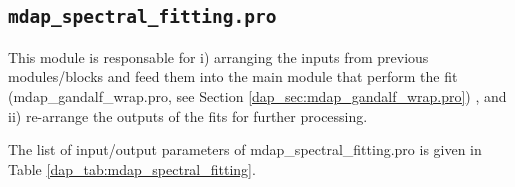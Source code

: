 \subsection{{\tt mdap\_spectral\_fitting.pro}}
\label{dap_sec:mdap_spectral_fitting}

This module is responsable for i) arranging the inputs from previous
modules/blocks and feed them into the main module that perform the fit
(mdap\_gandalf\_wrap.pro, see Section
\ref{dap_sec:mdap_gandalf_wrap.pro}) , and ii) re-arrange the outputs
of the fits for further processing.

The list of input/output parameters of mdap\_spectral\_fitting.pro is
given in Table \ref{dap_tab:mdap_spectral_fitting}.



